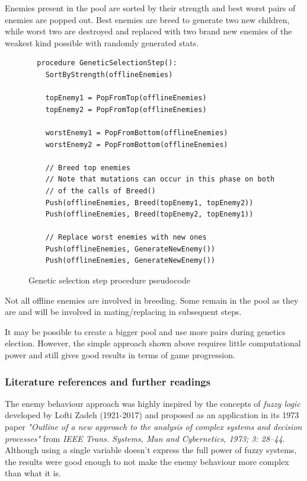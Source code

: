 \documentclass[11pt]{article}
\begin{document}
Enemies present in the pool are sorted by their strength and best worst pairs of enemies are popped out. Best enemies are breed to generate two new children, while worst two are destroyed and replaced with two brand new enemies of the weakest kind possible with randomly generated stats.

\begin{figure}[H]
  \begin{lstlisting}
  procedure GeneticSelectionStep():
    SortByStrength(offlineEnemies)

    topEnemy1 = PopFromTop(offlineEnemies)
    topEnemy2 = PopFromTop(offlineEnemies)

    worstEnemy1 = PopFromBottom(offlineEnemies)
    worstEnemy2 = PopFromBottom(offlineEnemies)

    // Breed top enemies
    // Note that mutations can occur in this phase on both
    // of the calls of Breed()
    Push(offlineEnemies, Breed(topEnemy1, topEnemy2))
    Push(offlineEnemies, Breed(topEnemy2, topEnemy1))

    // Replace worst enemies with new ones
    Push(offlineEnemies, GenerateNewEnemy())
    Push(offlineEnemies, GenerateNewEnemy())
  \end{lstlisting}
  \caption{Genetic selection step procedure pseudocode}
\end{figure}

Not all offline enemies are involved in breeding. Some remain in the pool as they are and will be involved in mating/replacing in subsequent steps.

It may be possible to create a bigger pool and use more pairs during genetics election. However, the simple approach shown above requires little computational power and still gives good results in terms of game progression.

\subsubsection{Literature references and further readings}

The enemy behaviour approach was highly inspired by the concepts of \textit{fuzzy logic} developed by Lofti Zadeh (1921-2017) and proposed as an application in its 1973 paper \textit{"Outline of a new approach to the analysis of complex systems and decision processes"} from \textit{IEEE Trans. Systems, Man and Cybernetics, 1973; 3: 28–44}. Although using a single variable doesn't express the full power of fuzzy systems, the results were good enough to not make the enemy behaviour more complex than what it is.
\end{document}
